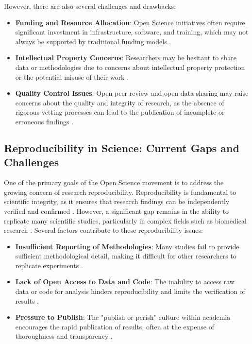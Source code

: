 \documentclass[final]{rc-book-2.14}
\begin{document}
However, there are also several challenges and drawbacks:
\begin{itemize}
    \item \textbf{Funding and Resource Allocation}: Open Science initiatives often require significant investment in infrastructure, software, and training, which may not always be supported by traditional funding models \cite{Borgman2012}.
    \item \textbf{Intellectual Property Concerns}: Researchers may be hesitant to share data or methodologies due to concerns about intellectual property protection or the potential misuse of their work \cite{Boulton2015}.
    \item \textbf{Quality Control Issues}: Open peer review and open data sharing may raise concerns about the quality and integrity of research, as the absence of rigorous vetting processes can lead to the publication of incomplete or erroneous findings \cite{Piwowar2011}.
\end{itemize}

\subsection{Reproducibility in Science: Current Gaps and Challenges}
One of the primary goals of the Open Science movement is to address the growing concern of research reproducibility. Reproducibility is fundamental to scientific integrity, as it ensures that research findings can be independently verified and confirmed \cite{Nosek2015}. However, a significant gap remains in the ability to replicate many scientific studies, particularly in complex fields such as biomedical research \cite{Borgman2012}. Several factors contribute to these reproducibility issues:
\begin{itemize}
    \item \textbf{Insufficient Reporting of Methodologies}: Many studies fail to provide sufficient methodological detail, making it difficult for other researchers to replicate experiments \cite{Leonelli2016}.
    \item \textbf{Lack of Open Access to Data and Code}: The inability to access raw data or code for analysis hinders reproducibility and limits the verification of results \cite{Piwowar2011}.
    \item \textbf{Pressure to Publish}: The "publish or perish" culture within academia encourages the rapid publication of results, often at the expense of thoroughness and transparency \cite{Boulton2015}.
\end{itemize}
\end{document}
